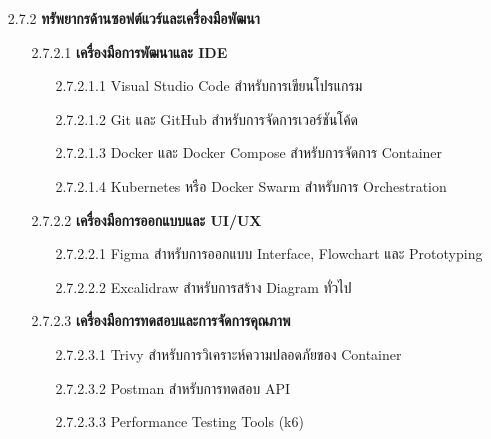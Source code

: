 \documentclass[12pt,a4paper]{article}
\begin{document}
\begin{enumerate}[leftmargin=2cm]
{\begin{enumerate}
            \vspace{1cm}

            \item[2.7.2] \textbf{ทรัพยากรด้านซอฟต์แวร์และเครื่องมือพัฒนา}
            \begin{enumerate}
                \item[2.7.2.1] \textbf{เครื่องมือการพัฒนาและ IDE}
                \begin{enumerate}
                    \item[2.7.2.1.1] Visual Studio Code สำหรับการเขียนโปรแกรม
                    \item[2.7.2.1.2] Git และ GitHub สำหรับการจัดการเวอร์ชันโค้ด
                    \item[2.7.2.1.3] Docker และ Docker Compose สำหรับการจัดการ Container
                    \item[2.7.2.1.4] Kubernetes หรือ Docker Swarm สำหรับการ Orchestration
                \end{enumerate}
                
                \item[2.7.2.2] \textbf{เครื่องมือการออกแบบและ UI/UX}
                \begin{enumerate}
                    \item[2.7.2.2.1] Figma สำหรับการออกแบบ Interface, Flowchart และ Prototyping
                    \item[2.7.2.2.2] Excalidraw สำหรับการสร้าง Diagram ทั่วไป
                \end{enumerate}
                
                \item[2.7.2.3] \textbf{เครื่องมือการทดสอบและการจัดการคุณภาพ}
                \begin{enumerate}
                    \item[2.7.2.3.1] Trivy สำหรับการวิเคราะห์ความปลอดภัยของ Container
                    \item[2.7.2.3.2] Postman สำหรับการทดสอบ API
                    \item[2.7.2.3.3] Performance Testing Tools (k6)
                \end{enumerate}
            \end{enumerate}

            \vspace{1cm}


\end{enumerate}}
\end{enumerate}
\end{document}
